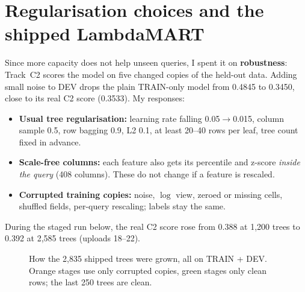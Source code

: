 \documentclass[10pt,a4paper]{article}
\begin{document}
\section{Regularisation choices and the shipped LambdaMART}
Since more capacity does not help unseen queries, I spent it on \textbf{robustness}: Track~C2 scores the model on five changed copies of the held-out data. Adding small noise to DEV drops the plain TRAIN-only model from 0.4845 to 0.3450, close to its real C2 score (0.3533). My responses:
\begin{itemize}
\item \textbf{Usual tree regularisation:} learning rate falling 0.05$\to$0.015, column sample 0.5, row bagging 0.9, L2 0.1, at least 20--40 rows per leaf, tree count fixed in advance.
\item \textbf{Scale-free columns:} each feature also gets its percentile and z-score \emph{inside the query} (408 columns). These do not change if a feature is rescaled.
\item \textbf{Corrupted training copies:} noise, $\log$ view, zeroed or missing cells, shuffled fields, per-query rescaling; labels stay the same.
\end{itemize}

During the staged run below, the real C2 score rose from 0.388 at 1{,}200 trees to 0.392 at 2{,}585 trees (uploads 18--22).

\begin{figure}[h]
\centering
{}
\caption{How the 2{,}835 shipped trees were grown, all on TRAIN + DEV. Orange stages use only corrupted copies, green stages only clean rows; the last 250 trees are clean.}
\label{fig:stages}
\end{figure}
\end{document}
